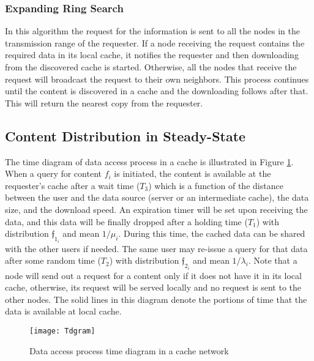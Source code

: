 \documentclass[journal]{IEEEtran}
\theoremstyle{plain}
\theoremstyle{remark}
\begin{document}
\subsubsection{Expanding Ring Search}
In this algorithm the request for the information is sent to all the nodes in the transmission range of the requester. If a node receiving the request contains the required data in its local cache, it notifies the requester and then downloading from the discovered cache is started. Otherwise, all the nodes that receive the request will broadcast the request to their own neighbors. This process continues until the content is discovered in a cache and the downloading follows after that. This will return the nearest copy from the requester.

\subsection{Content Distribution in Steady-State}
\label{SSanalysis}

The time diagram of data access process in a cache is illustrated in Figure \ref{fig:Tdgrm1}.
When a query for content $f_i$ is initiated, the content is available at the requester's cache after a wait time ($T_3$) which is a function of the distance between the user and the data source (server or an intermediate cache), the data size, and the download speed. An expiration timer will be set upon receiving the data, and this data will be finally dropped after a holding time ($T_1$) with distribution $\mathfrak{f}_{1_i}$ and mean $1/\mu_i$. During this time, the cached data can be shared with the other users if needed. The same user may re-issue a query for that data after some random time ($T_2$) with distribution $\mathfrak{f}_{2_i}$ and mean $1/\lambda_i$. Note that a node will send out a request for a content only if it does not have it in its local cache, otherwise, its request will be served locally and no request is sent to the other nodes. The solid lines in this diagram denote the portions of time that the data is available at local cache.

\begin{figure}[http]
    \center
      \texttt{[image: Tdgram]}\\
      \caption{Data access process time diagram in a cache network}
    \label{fig:Tdgrm1}
\end{figure}
\end{document}

